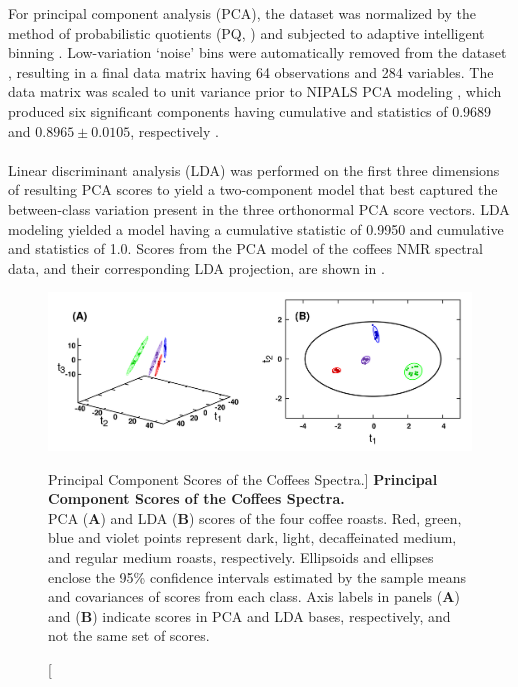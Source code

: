 \begin{doublespace}
For principal component analysis (PCA), the dataset was normalized by the
method of probabilistic quotients (PQ, \cite{dieterle:anchem2006}) and
subjected to adaptive intelligent binning \cite{demeyer:anchem2008}.
Low-variation `noise' bins were automatically removed from the dataset
\cite{zhang:opin2008}, resulting in a final data matrix having 64 observations
and 284 variables. The data matrix was scaled to unit variance
\cite{vandenberg:bmcg2006} prior to NIPALS PCA modeling \cite{jolliffe2002},
which produced six significant components having cumulative \rsqx{} and
\qsq{} statistics of 0.9689 and $0.8965 \pm 0.0105$, respectively
\cite{eshghi:cils2014}.
\\\\
Linear discriminant analysis (LDA) was performed on the first three dimensions
of resulting PCA scores to yield a two-component model that best
captured the between-class variation present in the three orthonormal PCA
score vectors. LDA modeling yielded a model having a cumulative \rsqx{}
statistic of 0.9950 and cumulative \rsqy{} and \qsq{} statistics of 1.0.
Scores from the PCA model of the coffees \hnmr{} NMR spectral data, and
their corresponding LDA projection, are shown in .
\end{doublespace}

\begin{figure}[ht!]
\includegraphics[width=6.5in]{figs/apps/03-pca-lda.png}
\caption
      [Principal Component Scores of the Coffees Spectra.]{
  {\bf Principal Component Scores of the Coffees Spectra.}
  \\
  PCA ({\bf A}) and LDA ({\bf B}) scores of the four coffee roasts. Red,
  green, blue and violet points represent dark, light, decaffeinated medium,
  and regular medium roasts, respectively. Ellipsoids and ellipses enclose
  the 95\% confidence intervals estimated by the sample means and covariances
  of scores from each class. Axis labels in panels ({\bf A}) and ({\bf B})
  indicate scores in PCA and LDA bases, respectively, and not the same set
  of scores.
}
\label{figure.4.3}
\end{figure}

